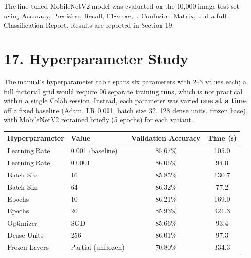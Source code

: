 \documentclass[11pt]{article}
\begin{document}
The fine-tuned MobileNetV2 model was evaluated on the 10{,}000-image test
set using Accuracy, Precision, Recall, F1-score, a Confusion Matrix, and a
full Classification Report. Results are reported in Section 19.


\section*{17. Hyperparameter Study}

The manual's hyperparameter table spans six parameters with 2--3 values
each; a full factorial grid would require 96 separate training runs, which
is not practical within a single Colab session. Instead, each parameter was
varied \textbf{one at a time} off a fixed baseline (Adam, LR 0.001, batch
size 32, 128 dense units, frozen base), with MobileNetV2 retrained briefly
(5 epochs) for each variant.

\begin{center}

\begin{tabular}{|l|l|c|c|}

\hline

Hyperparameter & Value & Validation Accuracy & Time (s)\\

\hline

Learning Rate & 0.001 (baseline) & 85.67\% & 105.0\\

\hline

Learning Rate & 0.0001 & 86.06\% & 94.0\\

\hline

Batch Size & 16 & 85.85\% & 130.7\\

\hline

Batch Size & 64 & 86.32\% & 77.2\\

\hline

Epochs & 10 & 86.21\% & 169.0\\

\hline

Epochs & 20 & 85.93\% & 321.3\\

\hline

Optimizer & SGD & 85.66\% & 93.4\\

\hline

Dense Units & 256 & 86.01\% & 97.3\\

\hline

Frozen Layers & Partial (unfrozen) & 70.80\% & 334.3\\

\hline

\end{tabular}

\end{center}
\end{document}
